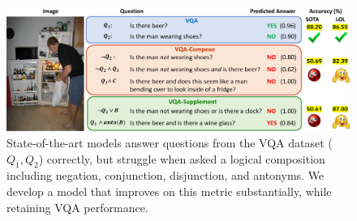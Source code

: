 \begin{figure}
    \centering
    \includegraphics[width=\linewidth]{vqalol/images/teaser_final.pdf}
    \caption{
        State-of-the-art models answer questions from the VQA dataset ($Q_1, Q_2$) correctly, but struggle when asked a logical composition including negation, conjunction, disjunction, and antonyms. 
        We develop a model that improves on this metric substantially, while retaining VQA performance.
        }
    \label{fig:motivation}
\end{figure}%